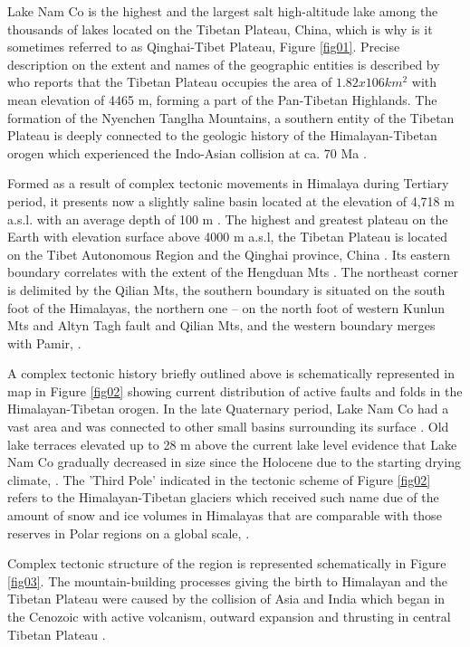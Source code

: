 \documentclass[final,5p,times,twocolumn]{elsarticle}
\begin{document}
Lake Nam Co is the highest and the largest salt high-altitude lake among the thousands of lakes located on the Tibetan Plateau, China, which is why is it sometimes referred to as Qinghai-Tibet Plateau, Figure \ref{fig01}. Precise description on the extent and names of the geographic entities is described by \cite{LIU2022103893} who reports that the Tibetan Plateau occupies the area of $1.82x106 km^2$ with mean elevation of 4465 m, forming a part of the Pan-Tibetan Highlands. The formation of the Nyenchen Tanglha Mountains, a southern entity of the Tibetan Plateau is deeply connected to the geologic history of the Himalayan-Tibetan orogen which experienced the Indo-Asian collision at ca. 70 Ma \cite{YinHarrison}. 

Formed as a result of complex tectonic movements in Himalaya during Tertiary period, it presents now a slightly saline basin located at the elevation of 4,718 m a.s.l. with an average depth of 100 m \cite{Wangetal2009Limnology}. The highest and greatest plateau on the Earth with elevation surface above 4000 m a.s.l, the Tibetan Plateau is located on the Tibet Autonomous Region and the Qinghai province, China \cite{LiBingyuan}. Its eastern boundary correlates with the extent of the Hengduan Mts \cite{Li1987,Li1989}. The northeast corner is delimited by the Qilian Mts, the southern boundary is situated on the south foot of the Himalayas, the northern one -- on the north foot of western Kunlun Mts and Altyn Tagh fault and Qilian Mts, and the western boundary merges with Pamir, \cite{ZHANGLiZheng}. 

A complex tectonic history briefly outlined above is schematically represented in map in Figure \ref{fig02} showing current distribution of active faults and folds in the Himalayan-Tibetan orogen. In the late Quaternary period, Lake Nam Co had a vast area and was connected to other small basins surrounding its surface \cite{tb00544}. Old lake terraces elevated up to 28 m above the current lake level evidence that Lake Nam Co gradually decreased in size since the Holocene due to the starting drying climate, \cite{Tsui}. The 'Third Pole' indicated in the tectonic scheme of Figure \ref{fig02} refers to the Himalayan-Tibetan glaciers which received such name due of the amount of snow and ice volumes in Himalayas that are comparable with those reserves in Polar regions on a global scale, \cite{Bolch,Adnan}. 

Complex tectonic structure of the region is represented schematically in Figure \ref{fig03}. The mountain-building processes giving the birth to Himalayan and the Tibetan Plateau were caused by the collision of Asia and India which began in the Cenozoic with active volcanism, outward expansion and thrusting in central Tibetan Plateau \cite{XIA2011850,TaylorAn,YANG2022105152}. 
\end{document}
